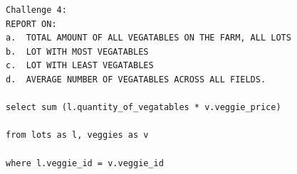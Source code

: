 \begin{lstlisting}
Challenge 4:
REPORT ON:
a.	TOTAL AMOUNT OF ALL VEGATABLES ON THE FARM, ALL LOTS
b.	LOT WITH MOST VEGATABLES
c.	LOT WITH LEAST VEGATABLES
d.	AVERAGE NUMBER OF VEGATABLES ACROSS ALL FIELDS.

select sum (l.quantity_of_vegatables * v.veggie_price) 

from lots as l, veggies as v

where l.veggie_id = v.veggie_id

\end{lstlisting}